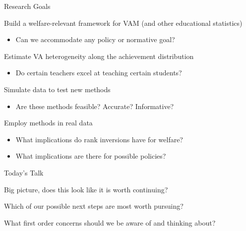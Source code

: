 \documentclass[t,aspectratio=169,11pt]{beamer}
\newenvironment{wideenumerate}{\enumerate\addtolength{\itemsep}{14pt}}{\endenumerate}
\begin{document}
\begin{frame}{Research Goals}

\begin{wideenumerate}
     \item Build a welfare-relevant framework for VAM (and other educational statistics) 
     \begin{itemize}
         \item Can we accommodate any policy or normative goal?
     \end{itemize}
    \item Estimate VA heterogeneity along the achievement distribution
    \begin{itemize}
        \item Do certain teachers excel at teaching certain students? 
    \end{itemize}
    \item Simulate data to test new methods
    \begin{itemize}
        \item Are these methods feasible? Accurate? Informative? 
    \end{itemize}
    \item Employ methods in real data
    \begin{itemize}
        \item What implications do rank inversions have for welfare?
        \item What implications are there for possible policies?
    \end{itemize}  

\end{wideenumerate}
\end{frame}

\begin{frame}[c]{Today's Talk}

\begin{wideenumerate}
    \item Big picture, does this look like it is worth continuing?
    \item Which of our possible next steps are most worth pursuing?
    \item What first order concerns should we be aware of and thinking about?

\end{wideenumerate}
\end{frame}
\end{document}
